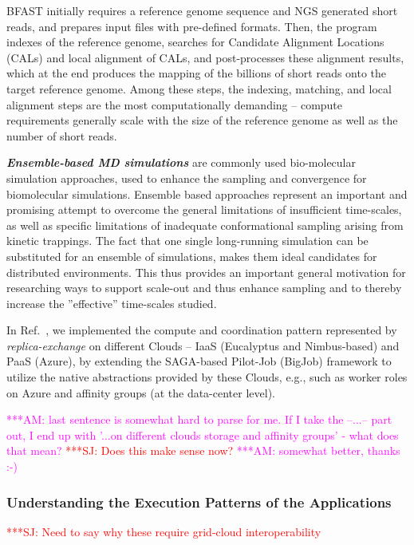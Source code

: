 \documentclass[10pt,conference,final,letterpaper,twoside,twocolumn,]{IEEEtran}
\newcommand{\amnote}[1]{  {\textcolor{magenta} {***AM: #1}}}
\newcommand{\jhanote}[1]{ {\textcolor{red}     {***SJ: #1}}}
\newcommand{\amnote}[1]{}
\newcommand{\jhanote}[1]{}
\newcommand{\I}[1]{\textit{#1}}
\newcommand{\B}[1]{\textbf{#1}}
\newcommand{\BI}[1]{\B{\I{#1}}}
\begin{document}
 BFAST initially requires a reference genome sequence and NGS
 generated short reads, and prepares input files with pre-defined
 formats.  Then, the program indexes of the reference genome, searches
 for Candidate Alignment Locations (CALs) and local alignment of CALs,
 and post-processes these alignment results, which at the end produces
 the mapping of the billions of short reads onto the target reference
 genome.  Among these steps, the indexing, matching, and local
 alignment steps are the most computationally demanding -- compute
 requirements generally scale with the size of the reference genome as
 well as the number of short reads.

 \BI{Ensemble-based MD simulations} are commonly used bio-molecular
 simulation approaches, used to enhance the sampling and convergence
 for biomolecular simulations.  Ensemble based approaches represent an
 important and promising attempt to overcome the general limitations
 of insufficient time-scales, as well as specific limitations of
 inadequate conformational sampling arising from kinetic trappings.
 The fact that one single long-running simulation can be substituted
 for an ensemble of simulations, makes them ideal candidates for
 distributed environments.  This thus provides an important general
 motivation for researching ways to support scale-out and thus enhance
 sampling and to thereby increase the ''effective'' time-scales
 studied. 
 
 In Ref.~\cite{ccgrid10, cloudcom10}, we implemented the compute
 and coordination pattern represented by \I{replica-exchange} on
 different Clouds -- IaaS (Eucalyptus and Nimbus-based) and PaaS
 (Azure), by extending the SAGA-based Pilot-Job (BigJob) framework to
 utilize the native abstractions provided by these Clouds, e.g., such
 as worker roles on Azure and affinity groups (at the data-center
 level).

 \amnote{last sentence is somewhat hard to parse for me.  If I take
   the --...-- part out, I end up with '...on different clouds storage
   and affinity groups' - what does that mean?}
 \jhanote{Does this make sense now?}
 \amnote{somewhat better, thanks :-)}


 \subsubsection*{Understanding the Execution Patterns of the
   Applications}

 \jhanote{Need to say why these require grid-cloud interoperability}
 
\end{document}
